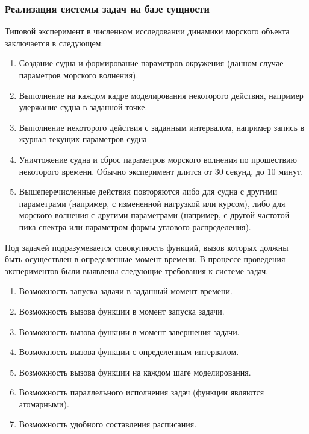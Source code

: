 \subsubsection{Реализация системы задач на базе сущности }
Типовой эксперимент в численном исследовании динамики морского объекта заключается в следующем:
\begin{enumerate}
	\item	Создание судна и формирование параметров окружения 
			(данном случае параметров морского волнения).
	\item	Выполнение на каждом кадре моделирования некоторого действия, например удержание судна 
			в заданной точке.
	\item	Выполнение некоторого действия с заданным интервалом, например запись в журнал текущих							параметров судна
	\item	Уничтожение судна и сброс параметров морского волнения по прошествию некоторого времени. 
			Обычно эксперимент длится от 30 секунд, до 10 минут.
	\item	Вышеперечисленные действия повторяются либо для судна с другими параметрами 
			(например, с измененной нагрузкой или курсом), либо для морского волнения с другими параметрами (например, с другой частотой пика спектра или параметром формы углового распределения).
\end{enumerate}

Под задачей подразумевается совокупность функций, вызов которых должны быть осуществлен в определенные момент времени. В процессе проведения экспериментов были выявлены следующие требования к системе задач.
\begin{enumerate}
	\item Возможность запуска задачи в заданный момент времени.
	\item Возможность вызова функции в момент запуска задачи. 
	\item Возможность вызова функции в момент завершения задачи.
	\item Возможность вызова функции с определенным интервалом.
	\item Возможность вызова функции на каждом шаге моделирования.
	\item Возможность параллельного исполнения задач (функции являются атомарными).
	\item Возможность удобного составления расписания.
\end{enumerate}

